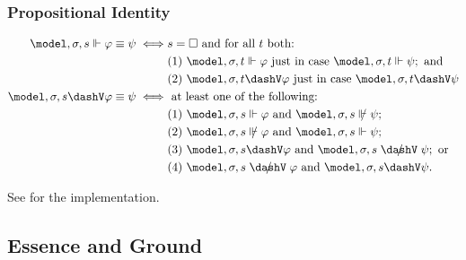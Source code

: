 \documentclass[../LogosReference.tex]{subfiles}
\begin{document}
\subsubsection{Propositional Identity}\label{sec:propositional-identity}

\begin{definition}\label{def:propid-verification}
	\begin{align}
		\model, \assignment, s \verifies \metaA \equiv \metaB  \iff
		 & s = \nullstate \text{ and for all } t \text{ both:} \notag                                                                     \\
		 & (1)~ \model, \assignment, t \verifies \metaA \text{ just in case } \model, \assignment, t \verifies \metaB; \text{ and} \notag \\
		 & (2)~ \model, \assignment, t \falsifies \metaA \text{ just in case } \model, \assignment, t \falsifies \metaB                   \\
		\model, \assignment, s \falsifies \metaA \equiv \metaB \iff
		 & \text{ at least one of the following:} \notag                                                                                                         \\
		 & (1)~ \model, \assignment, s \verifies \metaA \text{ and } \model, \assignment, s \nverifies \metaB; \notag                     \\
		 & (2)~ \model, \assignment, s \nverifies \metaA \text{ and } \model, \assignment, s \verifies \metaB; \notag                     \\
		 & (3)~ \model, \assignment, s \falsifies \metaA \text{ and } \model, \assignment, s \nfalsifies \metaB; \text{ or} \notag        \\
		 & (4)~ \model, \assignment, s \nfalsifies \metaA \text{ and } \model, \assignment, s \falsifies \metaB.
	\end{align}
\end{definition}

\noindent
See  for the implementation.


\subsection{Essence and Ground}\label{sec:essence-ground}
\end{document}
